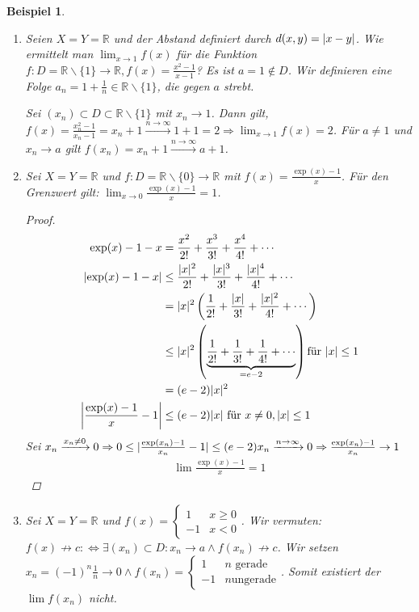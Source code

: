 \documentclass[ngerman,titlepage,twoside, parskip=half*]{scrreprt}
\newcommand*{\R}{\mathbb{R}}
\newcommand*{\perdef}{:\Leftrightarrow}
\theoremstyle{break}
\theoremstyle{nonumberbreak}
\newtheorem{beispiel}{Beispiel}
\newtheorem{proof}{Beweis:}
\DeclarePairedDelimiter{\abs}{\lvert}{\rvert}
\begin{document}
\begin{beispiel}
  \begin{enumerate}[(1)]
  \item Seien $X=Y=\R$ und der Abstand definiert durch $d(x,y)=\abs{x-y}$. Wie
    ermittelt man $\lim_{x\rightarrow 1} f(x)$ für die Funktion $f\colon D=\R
    \backslash \{1\}\rightarrow \R, f(x)=\frac{x^2-1}{x-1}$? Es ist $a=1\notin
    D$. Wir definieren eine Folge $a_n=1+\frac{1}{n} \in \R\backslash
    \{1\}$, die gegen $a$ strebt.

    Sei $(x_n)\subset D \subset \R \backslash \{1\}$ mit $x_n\rightarrow 1$.
    Dann gilt, $f(x)=\frac{x_n^2 -1}{x_n-1}=x_n+1 \xrightarrow{n\rightarrow
    \infty} 1+1=2 \Rightarrow \lim_{x \rightarrow 1} f(x)=2$. Für
    $a\neq 1$ und $x_n\rightarrow a$ gilt $f(x_n)=x_n+1 \xrightarrow{n
    \rightarrow \infty} a+1$.
  \item Sei $X=Y=\R$ und $f\colon D=\R\backslash \{0\}\rightarrow \R$ mit
    $f(x)=\frac{\exp(x)-1}{x}$. Für den Grenzwert gilt: $\lim_{x\rightarrow 0}
    \frac{\exp(x)-1}{x}=1$.
    \begin{proof}
      \begin{align*}
	\exp(x)-1-x &= \frac{x^2}{2!}+\frac{x^3}{3!}+\frac{x^4}{4!}+\dotsb\\
	\abs{\exp(x)-1-x} &\leq \frac{\abs{x}^2}{2!} +\frac{\abs{x}^3}{3!}
	   +\frac{\abs{x}^4}{4!}+\dotsb\\
	&= \abs{x}^2\left(\frac{1}{2!} +\frac{\abs{x}}{3!}
	   +\frac{\abs{x}^2}{4!} +\dotsb\right)\\
	&\leq \abs{x}^2\left(\underbrace{\frac{1}{2!} +\frac{1}{3!}
	   +\frac{1}{4!} +\dotsb}_{=e-2}\right) \text{für } \abs{x}\leq 1\\
	&= (e-2)\abs{x}^2\\
	\abs[\bigg]{\frac{\exp(x)-1}{x}-1} &\leq (e-2)\abs{x} \text{ für }
	   x\neq 0, \abs{x}\leq 1
    \end{align*}
    Sei $x_n\xrightarrow{x_n\neq 0} 0 \Rightarrow 0\leq
      \abs{\frac{\exp(x_n)-1}{x_n}-1}\leq (e-2)x_n \xrightarrow{n\rightarrow
      \infty} 0 \Rightarrow \frac{\exp(x_n)-1}{x_n}\rightarrow 1$
    \begin{gather*}\lim \frac{\exp(x)-1}{x}=1\end{gather*}
    \end{proof}
  \item Sei $X=Y=\R$ und $f(x)=\begin{cases}1 & x \geq 0\\-1 &
				 x<0\end{cases}$. Wir vermuten:
    $f(x)\not\rightarrow c \perdef \exists (x_n) \subset D\colon
    x_n\rightarrow a \wedge f(x_n)\not\rightarrow c$. Wir setzen
    $x_n=(-1)^n\frac{1}{n}\rightarrow 0 \wedge f(x_n)=\begin{cases}1 & n
							\text{ gerade}\\-1 & n
							\text{
							  ungerade}\end{cases}$.
    Somit existiert der $\lim f(x_n)$ nicht.
\end{enumerate}
\end{beispiel}
\end{document}
